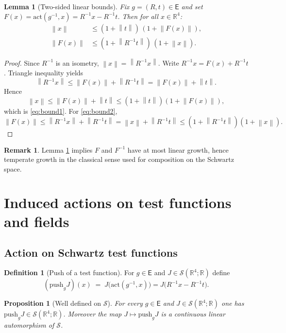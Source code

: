 \documentclass{article}
\newcommand{\R}{\mathbb{R}}
\newcommand{\Rd}{\mathbb{R}^4}
\newcommand{\norm}[1]{\left\lVert #1 \right\rVert}
\newcommand{\1}{\mathbbm{1}}
\newcommand{\Sch}{\mathscr{S}}
\newcommand{\push}{\mathrm{push}}
\theoremstyle{plain}
\newtheorem{prop}[theorem]{Proposition}
\newtheorem{lemma}[theorem]{Lemma}
\theoremstyle{definition}
\newtheorem{definition}[theorem]{Definition}
\newtheorem{remark}[theorem]{Remark}
\numberwithin{equation}{section}
\begin{document}
\begin{lemma}[Two-sided linear bounds]\label{lem:poly-bounds}
Fix $g=(R,t)\in\mathsf{E}$ and set $F(x)=\mathrm{act}(g^{-1},x)=R^{-1}x-R^{-1}t$. Then for all $x\in\Rd$:
\begin{align}
\norm{x} &\le (1+\norm{t})\,(1+\norm{F(x)}), \label{eq:bound1}\\
\norm{F(x)} &\le (1+\norm{R^{-1}t})\,(1+\norm{x}). \label{eq:bound2}
\end{align}
\end{lemma}

\begin{proof}
Since $R^{-1}$ is an isometry, $\norm{x}=\norm{R^{-1}x}$. Write $R^{-1}x = F(x)+R^{-1}t$. Triangle inequality yields
\[
\norm{R^{-1}x} \le \norm{F(x)}+\norm{R^{-1}t} = \norm{F(x)}+\norm{t}.
\]
Hence
\[
\norm{x}\le \norm{F(x)}+\norm{t} \le (1+\norm{t})(1+\norm{F(x)}),
\]
which is \eqref{eq:bound1}. For \eqref{eq:bound2},
\[
\norm{F(x)}\le \norm{R^{-1}x}+\norm{R^{-1}t}=\norm{x}+\norm{R^{-1}t}\le (1+\norm{R^{-1}t})(1+\norm{x}).
\]
\end{proof}

\begin{remark}
Lemma \ref{lem:poly-bounds} implies $F$ and $F^{-1}$ have at most linear growth, hence temperate growth in the classical sense used for composition on the Schwartz space.
\end{remark}

\section{Induced actions on test functions and fields}

\subsection{Action on Schwartz test functions}

\begin{definition}[Push of a test function]\label{def:push}
For $g\in\mathsf{E}$ and $J\in\Sch(\Rd;\R)$ define
\[
(\push_g J)(x) \;=\; J\bigl(\mathrm{act}(g^{-1},x)\bigr)
=J\bigl(R^{-1}x-R^{-1}t\bigr).
\]
\end{definition}

\begin{prop}[Well defined on $\Sch$]\label{prop:push-is-schwartz}
For every $g\in\mathsf{E}$ and $J\in\Sch(\Rd;\R)$ one has $\push_g J\in\Sch(\Rd;\R)$. Moreover the map $J\mapsto \push_g J$ is a continuous linear automorphism of $\Sch$.
\end{prop}
\end{document}

